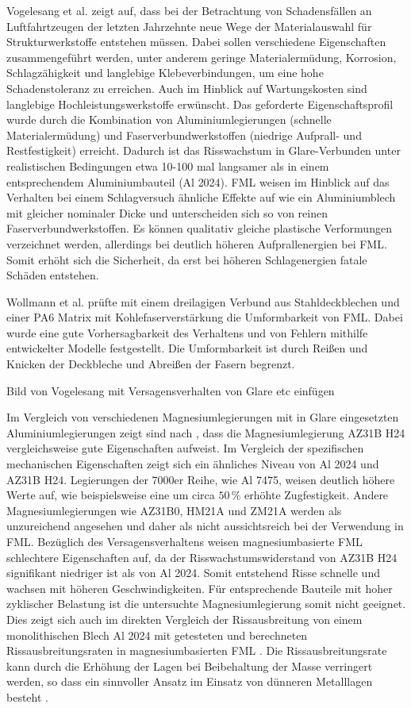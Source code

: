 Vogelesang et al. \cite{Vogelesang.2000} zeigt auf, dass bei der Betrachtung von Schadensfällen an Luftfahrtzeugen der letzten Jahrzehnte neue Wege der Materialauswahl für Strukturwerkstoffe entstehen müssen. Dabei sollen verschiedene Eigenschaften zusammengeführt werden, unter anderem geringe Materialermüdung, Korrosion, Schlagzähigkeit und langlebige Klebeverbindungen, um eine hohe Schadenstoleranz zu erreichen. Auch im Hinblick auf Wartungskosten sind langlebige Hochleistungswerkstoffe erwünscht. Das geforderte Eigenschaftsprofil wurde durch die Kombination von Aluminiumlegierungen (schnelle Materialermüdung) und Faserverbundwerkstoffen (niedrige Aufprall- und Restfestigkeit) erreicht. Dadurch ist das Risswachstum in Glare-Verbunden unter realistischen Bedingungen etwa 10-100 mal langsamer als in einem entsprechendem Aluminiumbauteil (Al 2024). FML weisen im Hinblick auf das Verhalten bei einem Schlagversuch ähnliche Effekte auf wie ein Aluminiumblech mit gleicher nominaler Dicke und unterscheiden sich so von reinen Faserverbundwerkstoffen. Es können qualitativ gleiche plastische Verformungen verzeichnet werden, allerdings bei deutlich höheren Aufprallenergien bei FML. Somit erhöht sich die Sicherheit, da erst bei höheren Schlagenergien fatale Schäden entstehen. 

Wollmann et al. \cite{Wollmann.2018} prüfte mit einem dreilagigen Verbund aus Stahldeckblechen und einer PA6 Matrix mit Kohlefaserverstärkung die Umformbarkeit von FML. Dabei wurde eine gute Vorhersagbarkeit des Verhaltens und von Fehlern mithilfe entwickelter Modelle festgestellt. Die Umformbarkeit ist durch Reißen und Knicken der Deckbleche und Abreißen der Fasern begrenzt.

Bild von Vogelesang mit Versagensverhalten von Glare etc einfügen

Im Vergleich von verschiedenen Magnesiumlegierungen mit in Glare eingesetzten Aluminiumlegierungen zeigt sind nach \cite{Alderliesten.2008}, dass die Magnesiumlegierung AZ31B H24  vergleichsweise gute Eigenschaften aufweist. 
Im Vergleich der spezifischen mechanischen Eigenschaften zeigt sich ein ähnliches Niveau von Al 2024 und AZ31B H24. Legierungen der 7000er Reihe, wie Al 7475, weisen deutlich höhere Werte auf, wie beispielsweise eine um circa $50 \, \%$ erhöhte Zugfestigkeit.
Andere Magnesiumlegierungen wie AZ31B0, HM21A und ZM21A werden als unzureichend angesehen und daher als nicht aussichtsreich bei der Verwendung in FML. Bezüglich des Versagensverhaltens weisen magnesiumbasierte FML schlechtere Eigenschaften auf, da der Risswachstumswiderstand von AZ31B H24 signifikant niedriger ist als von Al 2024. Somit entstehend Risse schnelle und wachsen mit höheren Geschwindigkeiten. Für entsprechende Bauteile mit hoher zyklischer Belastung ist die untersuchte Magnesiumlegierung somit nicht geeignet.
Dies zeigt sich auch im direkten Vergleich der Rissausbreitung von einem monolithischen Blech Al 2024 mit getesteten und berechneten Rissausbreitungsraten in magnesiumbasierten FML \cite{Alderliesten.20018,Cortes.2005}. Die Rissausbreitungsrate kann durch die Erhöhung der Lagen bei Beibehaltung der Masse verringert werden, so dass ein sinnvoller Ansatz im Einsatz von dünneren Metalllagen besteht \cite{Alderliesten.2008}.


